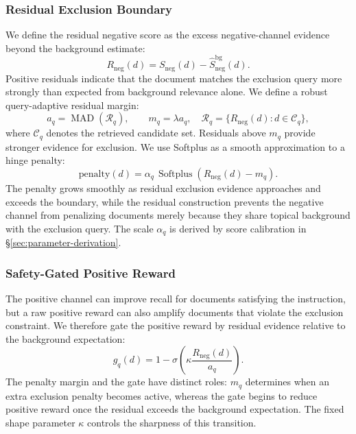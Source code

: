 \documentclass[letterpaper]{article}
\newcommand{\sneg}{S_{\text{neg}}}
\begin{document}
\subsubsection{Residual Exclusion Boundary}

We define the residual negative score as the excess negative-channel
evidence beyond the background estimate:
%
\begin{equation}
  R_{\text{neg}}(d)
    = \sneg(d) - \widehat{S}^{\text{bg}}_{\text{neg}}(d).
  \label{eq:residual}
\end{equation}
%
Positive residuals indicate that the document matches the exclusion
query more strongly than expected from background relevance alone.  We
define a robust query-adaptive residual margin:
%
\begin{equation}
  a_q = \operatorname{MAD}(\mathcal{R}_q),\qquad
  m_q = \lambda a_q,\quad
  \mathcal{R}_q=\{R_{\text{neg}}(d):d\in\mathcal{C}_q\},
  \label{eq:mad-margin}
\end{equation}
%
where $\mathcal{C}_q$ denotes the retrieved candidate set.  Residuals
above $m_q$ provide stronger evidence for exclusion.  We use
Softplus as a smooth approximation to a hinge penalty:
%
\begin{equation}
  \text{penalty}(d)
    = \alpha_q\,\operatorname{Softplus}\!\left(R_{\text{neg}}(d)-m_q\right).
  \label{eq:residual-penalty}
\end{equation}
%
The penalty grows smoothly as residual exclusion evidence approaches
and exceeds the boundary, while the residual construction prevents the
negative channel from penalizing documents merely because they share
topical background with the exclusion query.  The scale $\alpha_q$ is
derived by score calibration in \S\ref{sec:parameter-derivation}.

\subsubsection{Safety-Gated Positive Reward}

The positive channel can improve recall for documents satisfying the
instruction, but a raw positive reward can also amplify documents that
violate the exclusion constraint.  We therefore gate the positive
reward by residual evidence relative to the background expectation:
%
\begin{equation}
  g_q(d)
    = 1 - \sigma\!\left(
      \kappa \frac{R_{\text{neg}}(d)}{a_q}
    \right).
  \label{eq:safety}
\end{equation}
%
The penalty margin and the gate have distinct roles: $m_q$ determines
when an extra exclusion penalty becomes active, whereas the gate begins
to reduce positive reward once the residual exceeds the background
expectation.  The fixed shape parameter $\kappa$ controls the sharpness
of this transition.
\end{document}
